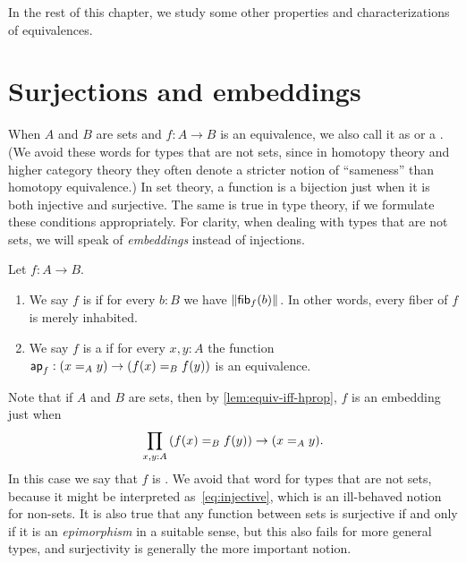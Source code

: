 In the rest of this chapter, we study some other properties and characterizations of equivalences.


\section{Surjections and embeddings}
\label{sec:mono-surj}

When $A$ and $B$ are sets and $f:A\to B$ is an equivalence, we also call it as 
%
or a .
%
(We avoid these words for types that are not sets, since in homotopy theory and higher category theory they often denote a stricter notion of ``sameness'' than homotopy equivalence.)
In set theory, a function is a bijection just when it is both injective and surjective.
The same is true in type theory, if we formulate these conditions appropriately.
For clarity, when dealing with types that are not sets, we will speak of \emph{embeddings} instead of injections.

\begin{defn}
  Let $f:A\to B$.
  \begin{enumerate}
  \item We say $f$ is 
    if for every $b:B$ we have $\brck{\hfib f b}$.
    In other words, every fiber of $f$ is merely inhabited.
  \item We say $f$ is a 
    if for every $x,y:A$ the function $\apfunc f : (\id[A]xy) \to (\id[B]{f(x)}{f(y)})$ is an equivalence.
  \end{enumerate}
\end{defn}

Note that if $A$ and $B$ are sets, then by \autoref{lem:equiv-iff-hprop}, $f$ is an embedding just when
\begin{equation}
  \prd{x,y:A} (\id[B]{f(x)}{f(y)}) \to (\id[A]xy).\label{eq:injective}
\end{equation}
In this case we say that $f$ is .
%
%
We avoid that word for types that are not sets, because it might be interpreted as~\eqref{eq:injective}, which is an ill-behaved notion for non-sets.
It is also true that any function between sets is surjective if and only if it is an \emph{epimorphism} in a suitable sense, but this also fails for more general types, and surjectivity is generally the more important notion.

